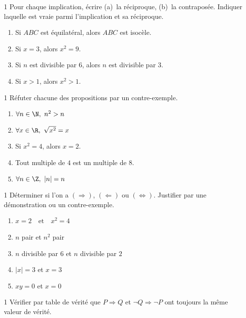 \begin{exo}{1}
Pour chaque implication, \'ecrire (a)~la r\'eciproque,
(b)~la contrapos\'ee.
Indiquer laquelle est vraie parmi l'implication et sa r\'eciproque.
\begin{enumerate}
  \item Si $ABC$ est \'equilat\'eral, alors $ABC$ est isoc\`ele.
  \item Si $x = 3$, alors $x^2 = 9$.
  \item Si $n$ est divisible par $6$, alors $n$ est divisible par $3$.
  \item Si $x > 1$, alors $x^2 > 1$.
\end{enumerate}
\end{exo}

\begin{exo}{1}
R\'efuter chacune des propositions par un contre-exemple.
\begin{enumerate}
  \item $\forall n \in \N,\ n^2 > n$
  \item $\forall x \in \R,\ \sqrt{x^2} = x$
  \item Si $x^2 = 4$, alors $x = 2$.
  \item Tout multiple de $4$ est un multiple de $8$.
  \item $\forall n \in \Z,\ |n| = n$
\end{enumerate}
\end{exo}

\begin{exo}{1}
D\'eterminer si l'on a $(\Rightarrow)$, $(\Leftarrow)$ ou $(\Leftrightarrow)$.
Justifier par une d\'emonstration ou un contre-exemple.
\begin{enumerate}
  \item $x = 2 \quad \text{et} \quad x^2 = 4$
  \item $n$ pair \quad et \quad $n^2$ pair
  \item $n$ divisible par $6$ \quad et \quad $n$ divisible par $2$
  \item $|x| = 3$ \quad et \quad $x = 3$
  \item $xy = 0$ \quad et \quad $x = 0$
\end{enumerate}
\end{exo}

\begin{exo}{1}
V\'erifier par table de v\'erit\'e que $P \Rightarrow Q$ et
$\lnot Q \Rightarrow \lnot P$ ont toujours la m\^eme valeur de v\'erit\'e.
\end{exo}

